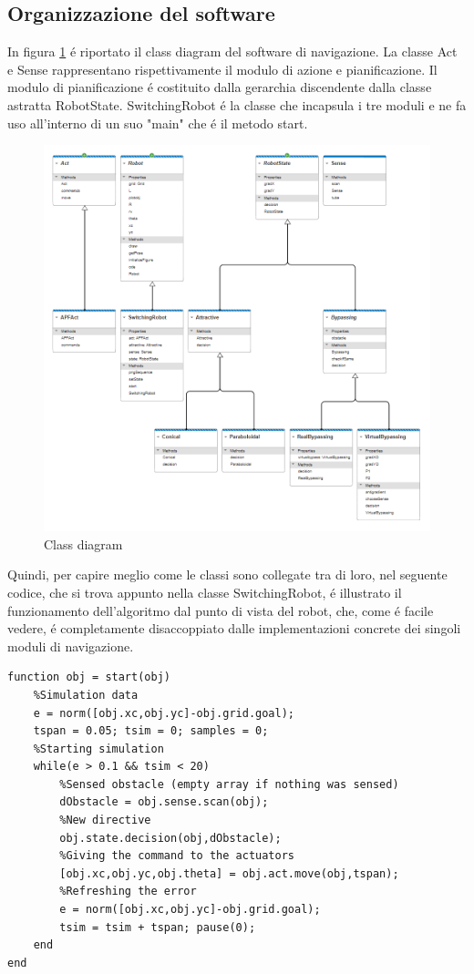 \documentclass[14pt,a4paper]{extarticle}
\begin{document}
\subsection{Organizzazione del software}

In figura \ref{class} é riportato il class diagram del software di navigazione. La classe Act e Sense rappresentano rispettivamente il modulo di azione e pianificazione. Il modulo di pianificazione é costituito dalla gerarchia discendente dalla classe astratta RobotState. SwitchingRobot é la classe che incapsula i tre moduli e ne fa uso all'interno di un suo "main" che é il metodo start.
\begin{figure}[H]
\centering
\label{class}
\caption{Class diagram}
\includegraphics[width=\textwidth]{classDiagram.png}
\end{figure}
Quindi, per capire meglio come le classi sono collegate tra di loro, nel seguente codice, che si trova appunto nella classe SwitchingRobot, é illustrato il funzionamento dell'algoritmo dal punto di vista del robot, che, come é facile vedere, é completamente disaccoppiato dalle implementazioni concrete dei singoli moduli di navigazione.
\begin{lstlisting}
function obj = start(obj)
	%Simulation data
	e = norm([obj.xc,obj.yc]-obj.grid.goal);
	tspan = 0.05; tsim = 0; samples = 0;
	%Starting simulation
	while(e > 0.1 && tsim < 20)
		%Sensed obstacle (empty array if nothing was sensed)
		dObstacle = obj.sense.scan(obj);
		%New directive
		obj.state.decision(obj,dObstacle);
		%Giving the command to the actuators 
		[obj.xc,obj.yc,obj.theta] = obj.act.move(obj,tspan);
		%Refreshing the error
		e = norm([obj.xc,obj.yc]-obj.grid.goal); 
		tsim = tsim + tspan; pause(0);
	end
end
\end{lstlisting}
\end{document}
